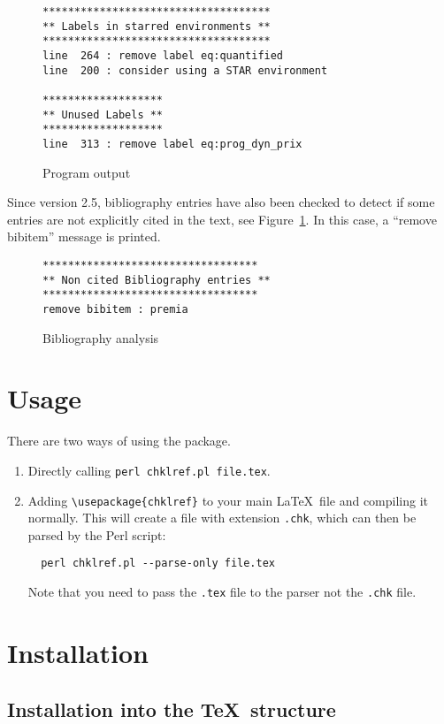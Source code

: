 \documentclass[a4paper,11pt,twoside]{article}
\begin{document}
\begin{figure}[!ht]
  \centering
\begin{verbatim}
************************************
** Labels in starred environments **
************************************
line  264 : remove label eq:quantified
line  200 : consider using a STAR environment

*******************
** Unused Labels **
*******************
line  313 : remove label eq:prog_dyn_prix
\end{verbatim}
  \caption{Program output}
  \label{fig:output}
\end{figure}

Since version 2.5, bibliography entries have also been checked to detect if some entries are not explicitly cited in the text, see Figure~\ref{fig:output}. In this case, a ``remove bibitem'' message is printed.
\begin{figure}[!ht]
  \centering
\begin{verbatim}
**********************************
** Non cited Bibliography entries **
**********************************
remove bibitem : premia
\end{verbatim}
  \caption{Bibliography analysis}
  \label{fig:biblio}
\end{figure}


\section{Usage}

There are two ways of using the package.

\begin{enumerate}
  \item Directly calling \verb!perl chklref.pl file.tex!.
  \item Adding \verb!\usepackage{chklref}! to your main \LaTeX\ file and compiling it normally. This will create a file with extension \verb!.chk!, which can then be parsed by the Perl script:
\begin{verbatim}
  perl chklref.pl --parse-only file.tex
\end{verbatim}
  Note that you need to pass the \verb!.tex! file to the parser not the \verb!.chk! file.
\end{enumerate}


\section{Installation}

\subsection{Installation into the \TeX\ structure}
\end{document}

